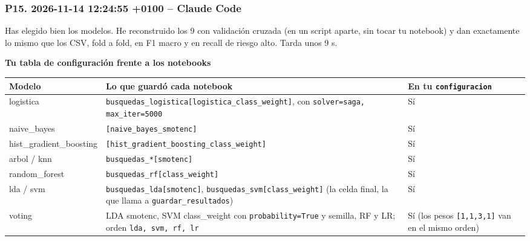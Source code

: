 \documentclass[11pt,a4paper]{article}
\begin{document}
\subsubsection*{P15. 2026-11-14 12:24:55 +0100 -- Claude Code}
{\small
Has elegido bien los modelos. He reconstruido los 9 con validación cruzada (en un script aparte, sin tocar tu notebook) y dan exactamente lo mismo que los CSV, fold a fold, en F1 macro y en recall de riesgo alto. Tarda unos 9 s.

\smallskip\noindent\textbf{Tu tabla de configuración frente a los notebooks}\par
{\footnotesize\noindent\begin{tabularx}{\linewidth}{>{\raggedright\arraybackslash}X>{\raggedright\arraybackslash}X>{\raggedright\arraybackslash}X}
\toprule
\textbf{Modelo} & \textbf{Lo que guardó cada notebook} & \textbf{En tu \texttt{configuracion}} \\
\midrule
logistica & \texttt{busquedas\_\allowbreak{}logistica[\textquotedbl{}logistica\_\allowbreak{}class\_\allowbreak{}weight\textquotedbl{}]}, con \texttt{solver=\textquotedbl{}saga\textquotedbl{}, max\_\allowbreak{}iter=5000} & Sí \\
naive\_\allowbreak{}bayes & \texttt{[\textquotedbl{}naive\_\allowbreak{}bayes\_\allowbreak{}smotenc\textquotedbl{}]} & Sí \\
hist\_\allowbreak{}gradient\_\allowbreak{}boosting & \texttt{[\textquotedbl{}hist\_\allowbreak{}gradient\_\allowbreak{}boosting\_\allowbreak{}class\_\allowbreak{}weight\textquotedbl{}]} & Sí \\
arbol /\allowbreak{} knn & \texttt{busquedas\_\allowbreak{}*[\textquotedbl{}smotenc\textquotedbl{}]} & Sí \\
random\_\allowbreak{}forest & \texttt{busquedas\_\allowbreak{}rf[\textquotedbl{}class\_\allowbreak{}weight\textquotedbl{}]} & Sí \\
lda /\allowbreak{} svm & \texttt{busquedas\_\allowbreak{}lda[\textquotedbl{}smotenc\textquotedbl{}]}, \texttt{busquedas\_\allowbreak{}svm[\textquotedbl{}class\_\allowbreak{}weight\textquotedbl{}]} (la celda final, la que llama a \texttt{guardar\_\allowbreak{}resultados}) & Sí \\
voting & LDA smotenc, SVM class\_\allowbreak{}weight con \texttt{probability=True} y semilla, RF y LR; orden \texttt{lda, svm, rf, lr} & Sí (los pesos \texttt{[1,1,3,1]} van en el mismo orden) \\
\bottomrule
\end{tabularx}}

}
\end{document}

